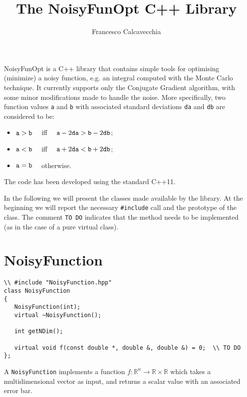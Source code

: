 \documentclass[11pt,a4paper,twoside]{article}
\title{The NoisyFunOpt C++ Library}
\author{Francesco Calcavecchia}
\begin{document}
\maketitle

NoisyFunOpt is a C++ library that contains simple tools for optimising (minimize) a noisy function, e.g. an integral computed with the Monte Carlo technique.
It currently supports only the Conjugate Gradient algorithm, with some minor modifications made to handle the noise.
More specifically, two function values \verb+a+ and \verb+b+ with associated standard deviations \verb+da+ and \verb+db+ are considered to be:
\begin{itemize}
   \item $\verb+a+ > \verb+b+ \quad $ iff $ \quad \verb+a+ - 2 \verb+da+ > \verb+b+ - 2 \verb+db+$;
   \item $\verb+a+ < \verb+b+ \quad $ iff $ \quad \verb+a+ + 2 \verb+da+ < \verb+b+ + 2 \verb+db+$;
   \item $\verb+a+ = \verb+b+ \quad $ otherwise.
\end{itemize}

The code has been developed using the standard C++11.

In the following we will present the classes made available by the library.
At the beginning we will report the necessary \verb+#include+ call and the prototype of the class.
The comment \verb+TO DO+ indicates that the method needs to be implemented (as in the case of a pure virtual class).


\section{NoisyFunction}
\label{sec:NoisyFunction}

\begin{verbatim}
\\ #include "NoisyFunction.hpp"
class NoisyFunction
{
   NoisyFunction(int);
   virtual ~NoisyFunction();
   
   int getNDim();
   
   virtual void f(const double *, double &, double &) = 0;  \\ TO DO
};
\end{verbatim}

A \verb+NoisyFunction+ implements a function $f:\mathbb{R}^{n} \rightarrow \mathbb{R} \times \mathbb{R}$ which takes a multidimensional vector as input, and returns a scalar value with an associated error bar. 
\end{document}
